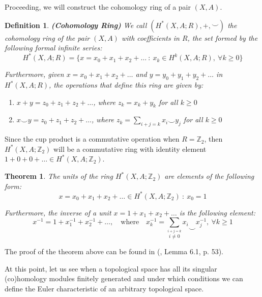 \documentclass[12pt,oneside]{book}
\newtheorem{defi}   {Definition}[chapter]
\newtheorem{teo}    {Theorem}[chapter]
\newcommand{\ds}{\displaystyle}
\newcommand{\Z}{\mathbb{Z}}
\newcommand{\ccup}{\smile}
\begin{document}
    Proceeding, we will construct the cohomology ring of a pair $(X,A)$.
    
    \begin{defi}{\bf (Cohomology Ring)}
        We call $(H^{*}(X,A;R), +, \ccup)$ the cohomology ring of the pair 
        $(X,A)$ with coefficients in $R$, the set formed by the following formal infinite series:
        $$
        H^{*}(X,A;R) = \{ x = x_{0} + x_{1} + x_{2} + \ldots \ : \ x_{k}\in H^{k}(X,A;R), \ \forall 
        k\geq 0 \}
        $$
        
        Furthermore, given $x = x_{0} + x_{1} + x_{2} + \ldots$ and $y = y_{0} + y_{1} + y_{2} + \ldots$ 
        in $H^{*}(X,A;R)$, the operations that define this ring are given by:
        
        \begin{enumerate}
            \item $x + y = z_{0} + z_{1} + z_{2} + \ldots$, where $z_{k} = x_{k} + y_{k}$ for all 
            $k\geq 0$
            \item $x\ccup y = z_{0} + z_{1} + z_{2} + \ldots$, where $z_{k} = 
            \displaystyle\sum_{i+j=k} x_{i}\ccup y_{j}$ for all $k\geq 0$
        \end{enumerate}
    \end{defi}

    Since the cup product is a commutative operation when $R=\Z_{2}$, then $H^{*}(X,A;\Z_{2})$ will be a commutative ring with identity 
    element $1+0+0+\dots\in H^{*}(X,A;\Z_{2})$.

    \begin{teo}\label{teo_elemento_inversivel}
        The units of the ring $H^{*}(X,A;\Z_{2})$ are elements of the following form:
        $$ x=x_{0}+x_{1}+x_{2}+\dots\in H^{*}(X,A;\Z_{2}) \ : \ x_{0}=1 $$
        
        Furthermore, the inverse of a unit $x=1+x_{1}+x_{2}+\dots$ is the following element:
        $$ x^{-1}=1+x^{-1}_{1}+x^{-1}_{2}+\dots, \quad \text{where} \quad x^{-1}_{k}=\ds\sum_{\stackrel{i+j=k}{i\neq 0}}x_{i}\ccup 
        x^{-1}_{j}, \ \forall k\geq 1 $$
    \end{teo}
    
    The proof of the theorem above can be found in (\cite{alex}, Lemma 6.1, p. 53).
    
    At this point, let us see when a topological space has all its singular (co)homology modules finitely generated and under which conditions 
    we can define the Euler characteristic of an arbitrary topological space.
    
\end{document}
